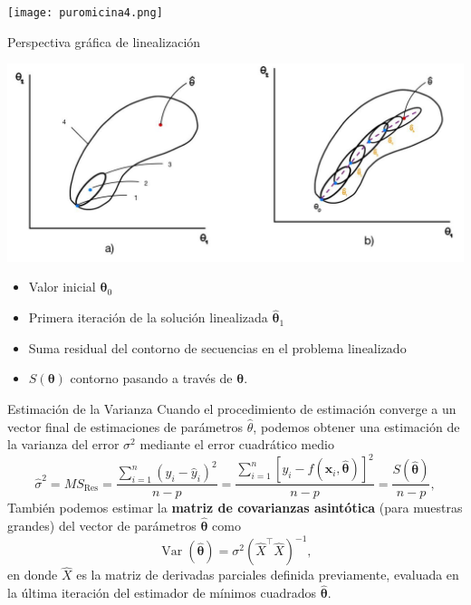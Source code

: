 \documentclass[aspectratio = 169, spanish]{beamer}
\begin{document}
\begin{frame}
    \begin{center}
        \texttt{[image: puromicina4.png]}
    \end{center}
\end{frame}

\begin{frame}{Perspectiva gráfica de linealización}
    \begin{center}
        \includegraphics[scale=0.28]{proy2.jpg}
    \end{center}
{\small\begin{itemize}
    \item Valor inicial $\bm{\theta}_0$
    \item Primera iteración de la solución linealizada $\hat{\bm{\theta}}_1$
    \item Suma residual del contorno de secuencias en el problema linealizado
    \item $S(\bm\theta)$ contorno pasando a través de $\bm\theta$.
\end{itemize}
}
\end{frame}


\begin{frame}{Estimación de la Varianza}
    Cuando el procedimiento de estimación converge a un vector final de estimaciones de parámetros $\hat{\theta}$, podemos obtener una estimación de la varianza del error $\sigma^2$ mediante el error cuadrático medio
\[
\hat{\sigma}^2 = MS_{\text{Res}} = \frac{\sum_{i=1}^{n}(y_i - \hat{y}_i)^2}{n-p} = \frac{\sum_{i=1}^{n}\left[y_i - f(\bm{x}_i, \bm{\hat{\theta}})\right]^2}{n-p} = \frac{S(\bm{\hat{\theta}})}{n-p},
\]
También podemos estimar la \textbf{matriz de covarianzas asintótica} (para muestras grandes) del vector de parámetros $\bm{\hat{\theta}}$ como
\begin{equation}\label{Eq-Var-asintotica}
    \operatorname{Var}(\bm{\hat{\theta}})=\sigma^2 {\left(\hat{X}^\top \hat{X}\right)}^{-1},
\end{equation}
en donde $\hat{X}$ es la matriz de derivadas parciales definida previamente, evaluada en la última iteración del estimador de mínimos cuadrados $\bm{\hat{\theta}}$.
\end{frame}
\end{document}

